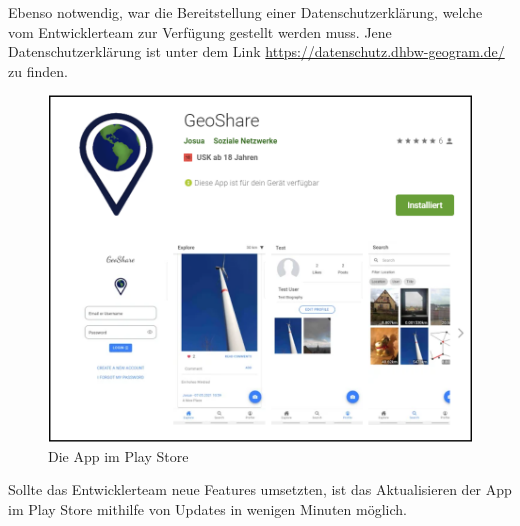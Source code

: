 Ebenso notwendig, war die Bereitstellung einer Datenschutzerklärung, welche vom Entwicklerteam zur Verfügung gestellt werden muss. Jene Datenschutzerklärung ist unter dem Link \glqq \url{https://datenschutz.dhbw-geogram.de/}\grqq{} zu finden.

\begin{figure}[H]
    \centering
    \includegraphics[width=0.9\linewidth]{images/playstore.png}
    \caption{Die App im Play Store}
    \label{fig:appinplaystore}
\end{figure}

Sollte das Entwicklerteam neue Features umsetzten, ist das Aktualisieren der App im Play Store mithilfe von Updates in wenigen Minuten möglich.